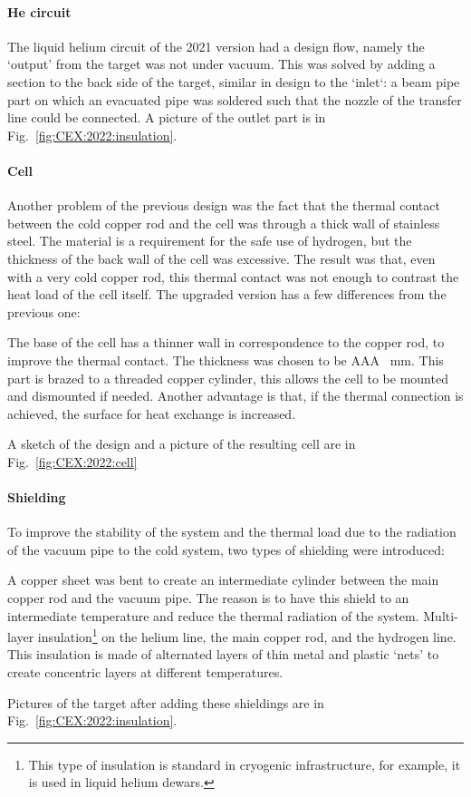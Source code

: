\begin{refsection}
        \paragraph{He circuit} The liquid helium circuit of the 2021 version had a  design flow, namely the `output' from the target was not under vacuum.
        This was solved by adding a section to the back side of the target, similar in design to the `inlet`: a beam pipe part on which an evacuated pipe was soldered such that the nozzle of the transfer line could be connected.
        A picture of the outlet part is in Fig.~\ref{fig:CEX:2022:insulation}.
        
        \paragraph{Cell} Another problem of the previous design was the fact that the thermal contact between the cold copper rod and the cell was through a thick wall of stainless steel. 
        The material is a requirement for the safe use of hydrogen, but the thickness of the back wall of the cell was excessive.
        The result was that, even with a very cold copper rod, this thermal contact was not enough to contrast the heat load of the cell itself.
        The upgraded version has a few differences from the previous one:
        \begin{outline}
            \1 The base of the cell has a thinner wall in correspondence to the copper rod, to improve the thermal contact. The thickness was chosen to be AAA \SI{}{mm}.
            \1 This part is brazed to a threaded copper cylinder, this allows the cell to be mounted and dismounted if needed. 
            Another advantage is that, if the thermal connection is achieved, the surface for heat exchange is increased.
        \end{outline}
        A sketch of the design and a picture of the resulting cell are in Fig.~\ref{fig:CEX:2022:cell}
        
        \paragraph{Shielding} To improve the stability of the system and the thermal load due to the radiation of the vacuum pipe to the cold system, two types of shielding were introduced:
        \begin{outline}
            \1 A copper sheet was bent to create an intermediate cylinder between the main copper rod and the vacuum pipe. The reason is to have this shield to an intermediate temperature and reduce the thermal radiation of the system. 
            \1 Multi-layer insulation\footnote{This type of insulation is standard in cryogenic infrastructure, for example, it is used in liquid helium dewars.} on the helium line, the main copper rod, and the hydrogen line. This insulation is made of alternated layers of thin metal and plastic `nets' to create concentric layers at different temperatures. 
        \end{outline}
        Pictures of the target after adding these shieldings are in Fig.~\ref{fig:CEX:2022:insulation}. 


\end{refsection}

